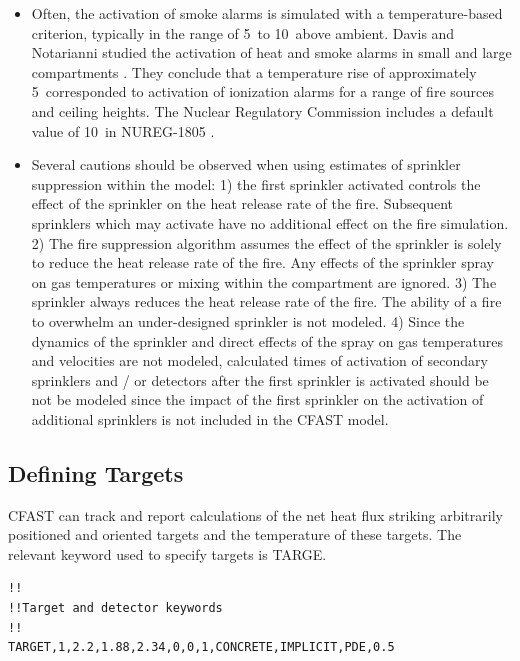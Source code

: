\begin{itemize}
\item Often, the activation of smoke alarms is simulated with a temperature-based criterion, typically in the range of 5~\degc to 10~\degc above ambient. Davis and Notarianni  studied the activation of heat and smoke alarms in small and large compartments \cite{Davis:1996}. They conclude that a temperature rise of approximately 5~\degc corresponded to activation of ionization alarms for a range of fire sources and ceiling heights. The Nuclear Regulatory Commission includes a default value of 10~\degc in NUREG-1805 \cite{NRCNUREG1805} .
\item Several cautions should be observed when using estimates of sprinkler suppression within the model: 1) the first sprinkler activated controls the effect of the sprinkler on the heat release rate of the fire.  Subsequent sprinklers which may activate have no additional effect on the fire simulation. 2) The fire suppression algorithm assumes the effect of the sprinkler is solely to reduce the heat release rate of the fire. Any effects of the sprinkler spray on gas temperatures or mixing within the compartment are ignored. 3) The sprinkler always reduces the heat release rate of the fire. The ability of a fire to overwhelm an under-designed sprinkler is not modeled. 4) Since the dynamics of the sprinkler and direct effects of the spray on gas temperatures and velocities are not modeled, calculated times of activation of secondary sprinklers and / or detectors after the first sprinkler is activated should be not be modeled since the impact of the first sprinkler on the activation of additional sprinklers is not included in the CFAST model.
\end{itemize}

\subsection{Defining Targets}

CFAST can track and report calculations of the net heat flux striking arbitrarily positioned and oriented targets and the temperature of these targets.  The relevant keyword used to specify targets is TARGE.

\newpage

\begin{lstlisting}
!!
!!Target and detector keywords
!!
TARGET,1,2.2,1.88,2.34,0,0,1,CONCRETE,IMPLICIT,PDE,0.5
\end{lstlisting}

